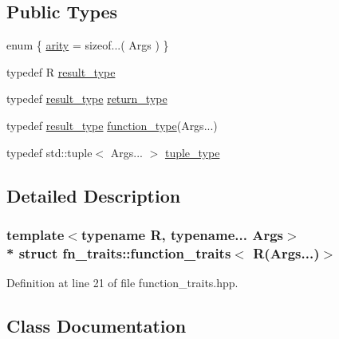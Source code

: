 \subsection*{Public Types}
\begin{DoxyCompactItemize}
\item 
enum \{ \hyperlink{structfn__traits_1_1function__traits_3_01_r_07_args_8_8_8_08_4_aafde9521d9646c97b984646d8273dd3ba2f612b5524050ab8d6ab3d54d52dbbb0}{arity} = sizeof...( Args )
 \}
\item 
typedef R \hyperlink{structfn__traits_1_1function__traits_3_01_r_07_args_8_8_8_08_4_a1b509243ed1b4707465625de10e6c6bb}{result\+\_\+type}
\item 
typedef \hyperlink{structfn__traits_1_1function__traits_3_01_r_07_args_8_8_8_08_4_a1b509243ed1b4707465625de10e6c6bb}{result\+\_\+type} \hyperlink{structfn__traits_1_1function__traits_3_01_r_07_args_8_8_8_08_4_adf6a35a9b703dfb4778e59f132e00a9b}{return\+\_\+type}
\item 
typedef \hyperlink{structfn__traits_1_1function__traits_3_01_r_07_args_8_8_8_08_4_a1b509243ed1b4707465625de10e6c6bb}{result\+\_\+type} \hyperlink{structfn__traits_1_1function__traits_3_01_r_07_args_8_8_8_08_4_a85e5883a1c8050fe442c1072386b2d11}{function\+\_\+type}(Args...)
\item 
typedef std\+::tuple$<$ Args... $>$ \hyperlink{structfn__traits_1_1function__traits_3_01_r_07_args_8_8_8_08_4_a9b60ae8c79e52addf352e4ae7c8077b4}{tuple\+\_\+type}
\end{DoxyCompactItemize}


\subsection{Detailed Description}
\subsubsection*{template$<$typename R, typename... Args$>$\\*
struct fn\+\_\+traits\+::function\+\_\+traits$<$ R(\+Args...)$>$}



Definition at line 21 of file function\+\_\+traits.\+hpp.



\subsection{Class Documentation}
\label{structfn__traits_1_1function__traits_3_01_r_07_args_8_8_8_08_4_1_1arg}
\hypertarget{structfn__traits_1_1function__traits_3_01_r_07_args_8_8_8_08_4_structfn__traits_1_1function__traits_3_01_r_07_args_8_8_8_08_4_1_1arg}{}
